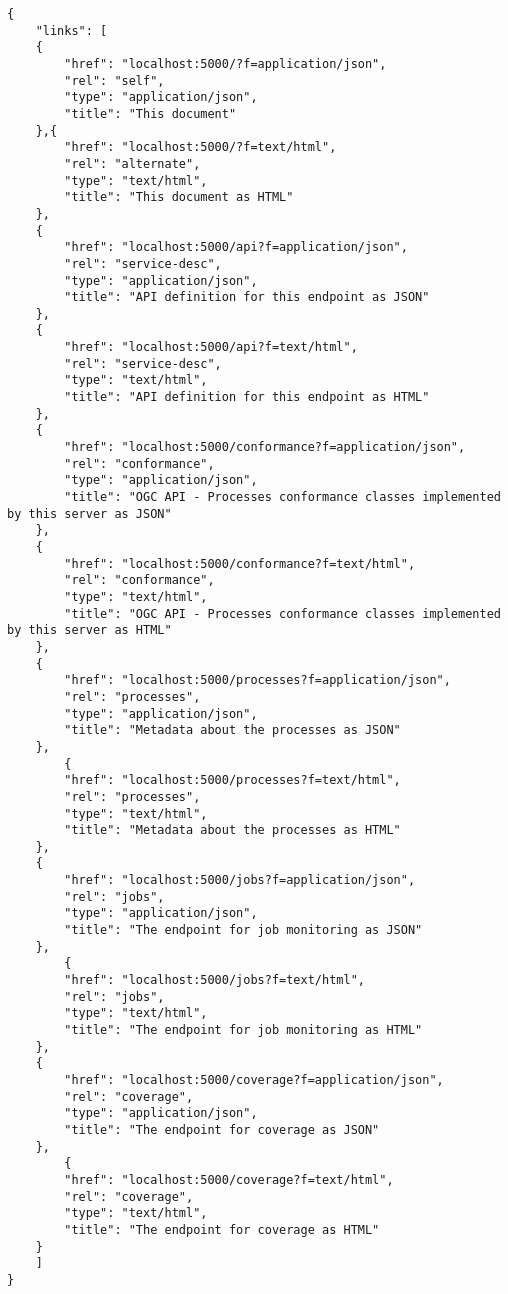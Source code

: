 \begin{lstlisting}[caption={landingPage.json}, style = JSON]
{
    "links": [
    {
        "href": "localhost:5000/?f=application/json",
        "rel": "self",
        "type": "application/json",
        "title": "This document"
    },{
        "href": "localhost:5000/?f=text/html",
        "rel": "alternate",
        "type": "text/html",
        "title": "This document as HTML"
    },
    {
        "href": "localhost:5000/api?f=application/json",
        "rel": "service-desc",
        "type": "application/json",
        "title": "API definition for this endpoint as JSON"
    },
    {
        "href": "localhost:5000/api?f=text/html",
        "rel": "service-desc",
        "type": "text/html",
        "title": "API definition for this endpoint as HTML"
    },
    {
        "href": "localhost:5000/conformance?f=application/json",
        "rel": "conformance",
        "type": "application/json",
        "title": "OGC API - Processes conformance classes implemented by this server as JSON"
    },
    {
        "href": "localhost:5000/conformance?f=text/html",
        "rel": "conformance",
        "type": "text/html",
        "title": "OGC API - Processes conformance classes implemented by this server as HTML"
    },
    {
        "href": "localhost:5000/processes?f=application/json",
        "rel": "processes",
        "type": "application/json",
        "title": "Metadata about the processes as JSON"
    },
        {
        "href": "localhost:5000/processes?f=text/html",
        "rel": "processes",
        "type": "text/html",
        "title": "Metadata about the processes as HTML"
    },
    {
        "href": "localhost:5000/jobs?f=application/json",
        "rel": "jobs",
        "type": "application/json",
        "title": "The endpoint for job monitoring as JSON"
    },
        {
        "href": "localhost:5000/jobs?f=text/html",
        "rel": "jobs",
        "type": "text/html",
        "title": "The endpoint for job monitoring as HTML"
    },
    {
        "href": "localhost:5000/coverage?f=application/json",
        "rel": "coverage",
        "type": "application/json",
        "title": "The endpoint for coverage as JSON"
    },
        {
        "href": "localhost:5000/coverage?f=text/html",
        "rel": "coverage",
        "type": "text/html",
        "title": "The endpoint for coverage as HTML"
    }
    ]
}
\end{lstlisting}\label{appendixlandingPageJSON}  

